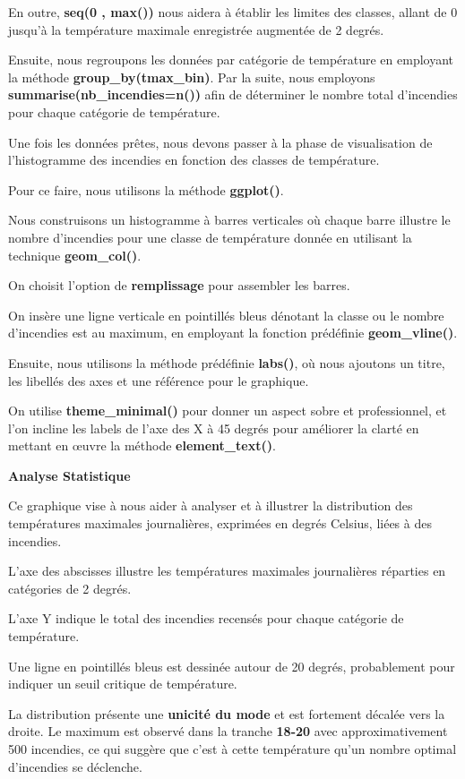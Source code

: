 \documentclass[
]{article}
\begin{document}
En outre, \textbf{seq(0 , max())} nous aidera à établir les limites des
classes, allant de 0 jusqu'à la température maximale enregistrée
augmentée de 2 degrés.

Ensuite, nous regroupons les données par catégorie de température en
employant la méthode \textbf{group\_by(tmax\_bin)}. Par la suite, nous
employons \textbf{summarise(nb\_incendies=n())} afin de déterminer le
nombre total d'incendies pour chaque catégorie de température.

Une fois les données prêtes, nous devons passer à la phase de
visualisation de l'histogramme des incendies en fonction des classes de
température.

Pour ce faire, nous utilisons la méthode \textbf{ggplot()}.

Nous construisons un histogramme à barres verticales où chaque barre
illustre le nombre d'incendies pour une classe de température donnée en
utilisant la technique \textbf{geom\_col()}.

On choisit l'option de \textbf{remplissage} pour assembler les barres.

On insère une ligne verticale en pointillés bleus dénotant la classe ou
le nombre d'incendies est au maximum, en employant la fonction
prédéfinie \textbf{geom\_vline()}.

Ensuite, nous utilisons la méthode prédéfinie \textbf{labs()}, où nous
ajoutons un titre, les libellés des axes et une référence pour le
graphique.

On utilise \textbf{theme\_minimal()} pour donner un aspect sobre et
professionnel, et l'on incline les labels de l'axe des X à 45 degrés
pour améliorer la clarté en mettant en œuvre la méthode
\textbf{element\_text()}.

\textbf{Analyse Statistique}

Ce graphique vise à nous aider à analyser et à illustrer la distribution
des températures maximales journalières, exprimées en degrés Celsius,
liées à des incendies.

L'axe des abscisses illustre les températures maximales journalières
réparties en catégories de 2 degrés.

L'axe Y indique le total des incendies recensés pour chaque catégorie de
température.

Une ligne en pointillés bleus est dessinée autour de 20 degrés,
probablement pour indiquer un seuil critique de température.

La distribution présente une \textbf{unicité du mode} et est fortement
décalée vers la droite. Le maximum est observé dans la tranche
\textbf{18-20} avec approximativement 500 incendies, ce qui suggère que
c'est à cette température qu'un nombre optimal d'incendies se déclenche.
\end{document}
